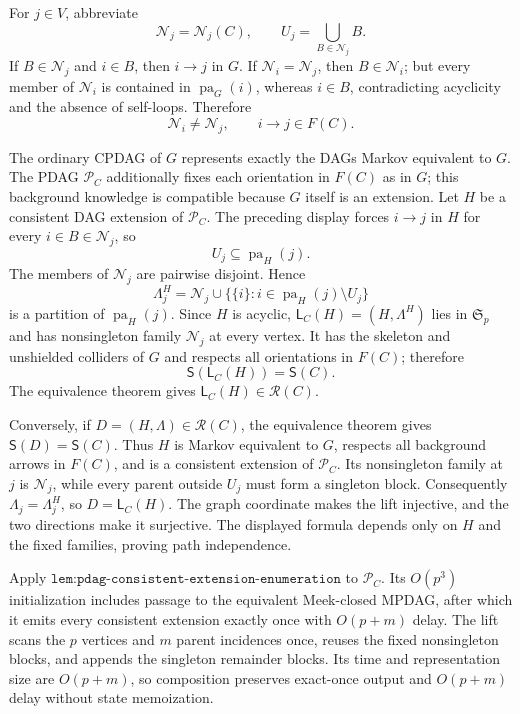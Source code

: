 For \(j\in V\), abbreviate
\[
 \mathcal N_j=\mathcal N_j(C),
 \qquad U_j=\bigcup_{B\in\mathcal N_j}B.
\]
If \(B\in\mathcal N_j\) and \(i\in B\), then \(i\to j\) in \(G\). If \(\mathcal N_i=\mathcal N_j\), then \(B\in\mathcal N_i\); but every member of \(\mathcal N_i\) is contained in \(\operatorname{pa}_G(i)\), whereas \(i\in B\), contradicting acyclicity and the absence of self-loops. Therefore
\[
 \mathcal N_i\neq\mathcal N_j,
 \qquad i\to j\in F(C).
\]

The ordinary CPDAG of \(G\) represents exactly the DAGs Markov equivalent to \(G\). The PDAG \(\mathcal P_C\) additionally fixes each orientation in \(F(C)\) as in \(G\); this background knowledge is compatible because \(G\) itself is an extension. Let \(H\) be a consistent DAG extension of \(\mathcal P_C\). The preceding display forces \(i\to j\) in \(H\) for every \(i\in B\in\mathcal N_j\), so
\[
 U_j\subseteq\operatorname{pa}_H(j).
\]
The members of \(\mathcal N_j\) are pairwise disjoint. Hence
\[
 \Lambda^H_j=\mathcal N_j\cup
 \{\{i\}:i\in\operatorname{pa}_H(j)\setminus U_j\}
\]
is a partition of \(\operatorname{pa}_H(j)\). Since \(H\) is acyclic, \(\mathsf L_C(H)=(H,\Lambda^H)\) lies in \(\mathfrak S_p\) and has nonsingleton family \(\mathcal N_j\) at every vertex. It has the skeleton and unshielded colliders of \(G\) and respects all orientations in \(F(C)\); therefore
\[
 \mathsf S(\mathsf L_C(H))=\mathsf S(C).
\]
The equivalence theorem gives \(\mathsf L_C(H)\in\mathcal R(C)\).

Conversely, if \(D=(H,\Lambda)\in\mathcal R(C)\), the equivalence theorem gives \(\mathsf S(D)=\mathsf S(C)\). Thus \(H\) is Markov equivalent to \(G\), respects all background arrows in \(F(C)\), and is a consistent extension of \(\mathcal P_C\). Its nonsingleton family at \(j\) is \(\mathcal N_j\), while every parent outside \(U_j\) must form a singleton block. Consequently \(\Lambda_j=\Lambda^H_j\), so \(D=\mathsf L_C(H)\). The graph coordinate makes the lift injective, and the two directions make it surjective. The displayed formula depends only on \(H\) and the fixed families, proving path independence.

Apply \(\texttt{lem:pdag-consistent-extension-enumeration}\) to \(\mathcal P_C\). Its \(O(p^3)\) initialization includes passage to the equivalent Meek-closed MPDAG, after which it emits every consistent extension exactly once with \(O(p+m)\) delay. The lift scans the \(p\) vertices and \(m\) parent incidences once, reuses the fixed nonsingleton blocks, and appends the singleton remainder blocks. Its time and representation size are \(O(p+m)\), so composition preserves exact-once output and \(O(p+m)\) delay without state memoization.

